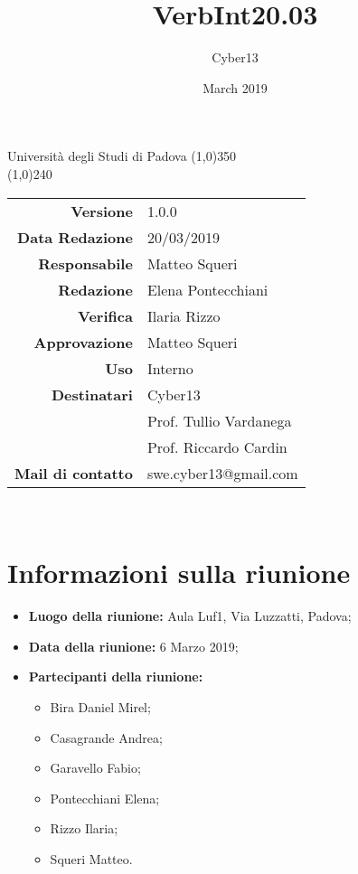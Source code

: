 \documentclass[a4paper, 12pt]{article}
\title{VerbInt20.03}
\author{Cyber13}
\date{March 2019}
\begin{document}
	\begin{titlepage}
		\centering Università degli Studi di Padova
		\line(1,0){350}\\
		\vspace{1.2cm}
		\logo
		\vspace{1.0cm}
		\vspace{0.5cm}
		\vspace{0.5cm}
		\line(1,0){240}\\
		\begin{tabular}{r|l}
			{\textbf{Versione}} 		& 1.0.0\\
			{\textbf{Data Redazione}} 	& 20/03/2019\\	%
			{\textbf{Responsabile}} 	& Matteo Squeri\\	%
			{\textbf{Redazione}} 		& Elena Pontecchiani\\ 
			{\textbf{Verifica}} 			& Ilaria Rizzo\\ 
			{\textbf{Approvazione}} 		& Matteo Squeri\\
			{\textbf{Uso}} 				& Interno\\
			{\textbf{Destinatari}} 	& Cyber13\\ & Prof. Tullio Vardanega\\ & Prof. Riccardo Cardin\\
			{\textbf{Mail di contatto}} 	& swe.cyber13@gmail.com\\
		\end{tabular}\\
	\end{titlepage}


\newpage
		
	
	\newpage
		\tableofcontents
	    	\newpage
        	\section{Informazioni sulla riunione}
\begin{itemize}
	\item \textbf{Luogo della riunione:} Aula Luf1, Via Luzzatti, Padova;
	\item \textbf{Data della riunione:} 6 Marzo 2019;
	
	\item \textbf{Partecipanti della riunione:}
		\begin{itemize}
		    \item Bira Daniel Mirel;
		    \item Casagrande Andrea;
            \item Garavello Fabio;
            \item Pontecchiani Elena;
			\item Rizzo Ilaria;
			\item Squeri Matteo.
		\end{itemize}
\end{itemize}
	
\end{document}
